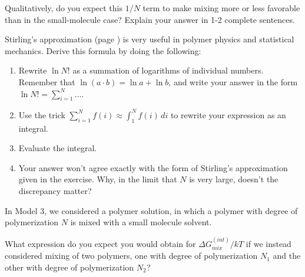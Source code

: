 \begin{activity}
\begin{ctqs}
		\question Qualitatively, do you expect this $1/N$ term to make mixing more or less favorable than in the small-molecule case?  Explain your answer in 1-2 complete sentences.
		
			\begin{solution}[1.75in]
			\end{solution}
			
\end{ctqs}

\begin{exercises}

		\exercise Stirling's approximation (page \pageref{eqn:stirling}) is very useful in polymer physics and statistical mechanics.  Derive this formula by doing the following:
			\begin{enumerate}
				\item Rewrite $\ln N!$ as a summation of logarithms of individual numbers.  Remember that $\ln (a\cdot b) = \ln a + \ln b$, and write your answer in the form $\ln N! = \sum_{i=1}^N \dots$.
				\item Use the trick $\sum_{i=1}^{N} f(i) \approx \int_1^N f(i)\,di$ to rewrite your expression as an integral.
				\item Evaluate the integral.
				\item Your answer won't agree exactly with the form of Stirling's approximation given in the exercise.  Why, in the limit that $N$ is very large, doesn't the discrepancy matter?
			\end{enumerate}
			
		\exercise In Model 3, we considered a polymer solution, in which a polymer with degree of polymerization $N$ is mixed with a small molecule solvent.
		
			What expression do you expect you would obtain for $\Delta G_{mix}^{(int)}/kT$ if we instead considered mixing of two polymers, one with degree of polymerization $N_1$ and the other with degree of polymerization $N_2$?
\end{exercises}
	
\end{activity}